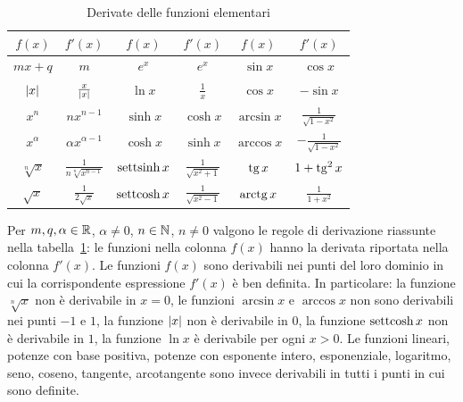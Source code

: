 \begin{table}
  \begin{tabular}{c|c||c|c||c|c}
    $f(x)$ & $f'(x)$ & $f(x)$ & $f'(x)$ & $f(x)$ & $f'(x)$
    \\\hline
    $mx + q$ & $m$ &
    $e^x$ & $e^x$ &
    $\sin x$ & $\cos x$ \\
    ${\left|x\right|}$ & $\frac{x}{{\left|x\right|}}$ &
    $\ln x$ & $\frac 1 x$ &
    $\cos x$ & $-\sin x$ \\
    $x^n$ & $n x^{n-1}$ &
    $\sinh x$ & $\cosh x$ &
    $\arcsin x$ & $\frac{1}{\sqrt{1-x^2}}$ \\
    $x^\alpha$ & $\alpha x^{\alpha -1}$ &
    $\cosh x$ & $\sinh x$ & $\arccos x$ & $-\frac{1}{\sqrt{1-x^2}}$ \\
    $\sqrt[n]{x}$ & $\frac{1}{n\sqrt[n]{x^{n-1}}}$ &
    $\operatorname{settsinh} x$ & $\frac{1}{\sqrt{x^2+1}}$ &
    $\operatorname{tg} x$ & $1+ \operatorname{tg}^2 x$ \\
    $\sqrt{x}$ & $\frac{1}{2\sqrt{x}}$ &
    $\operatorname{settcosh} x$ & $\frac{1}{\sqrt{x^2-1}}$ &
    $\operatorname{arctg} x$ & $\frac{1}{1+x^2}$
  \end{tabular}
  \caption{Derivate delle funzioni elementari}
  \label{tab:derivate}%
\end{table}

\begin{theorem}%
\label{th:derivate_elementari}%
%
\mymark{**}%
Per $m,q,\alpha \in {\mathbb R}$, $\alpha \neq 0$, $n\in {\mathbb N}$, $n\neq 0$
valgono le regole di derivazione riassunte nella
tabella~\ref{tab:derivate}: le funzioni nella colonna
$f(x)$ hanno la derivata riportata nella colonna $f'(x)$.
Le funzioni $f(x)$ sono derivabili nei punti del loro dominio 
in cui la corrispondente espressione $f'(x)$ è ben definita.
In particolare:
la funzione $\sqrt[n]{x}$
non è derivabile in $x=0$,
le funzioni $\arcsin x$ e $\arccos x$ non sono derivabili nei punti $-1$ e $1$,
la funzione ${\left|x\right|}$ non è derivabile in $0$,
la funzione $\operatorname{settcosh} x$ non è derivabile in $1$,
la funzione $\ln x$ è derivabile per ogni $x>0$.
Le funzioni lineari, potenze con base positiva, potenze con esponente intero,
esponenziale, logaritmo, seno, coseno, tangente, arcotangente sono invece derivabili
in tutti i punti in cui sono definite.
\end{theorem}

